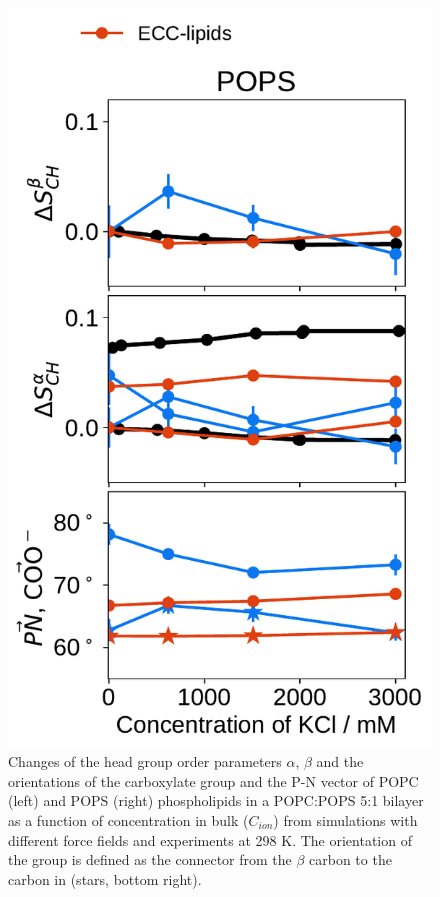 \documentclass[journal=jpcbfk,manuscript=article]{achemso}
\newlength{\figheight}
\begin{document}
\begin{figure}[tbp!]
  \includegraphics[height=\figheight]{../img/ecc_pops/order_parameters_changes_ecc-lip_L14_A-B-PN-COO_POPS_kcl.pdf} 
  \caption{\label{fig:delta_ordPar_KCl_PCPS} 
    Changes of the head group order parameters $\alpha$, $\beta$ and the orientations of the carboxylate group and the P-N vector  
    of POPC (left) and POPS (right) phospholipids in a POPC:POPS 5:1 bilayer as a function of  concentration 
    in bulk ($C_{ion}$) from simulations with different force fields and experiments at 298 K. \citep{roux90}
    The orientation of the  group is defined as 
    the connector from the $\beta$ carbon to the carbon in  (stars, bottom right). 
  }
\end{figure} 
 
\end{document}
